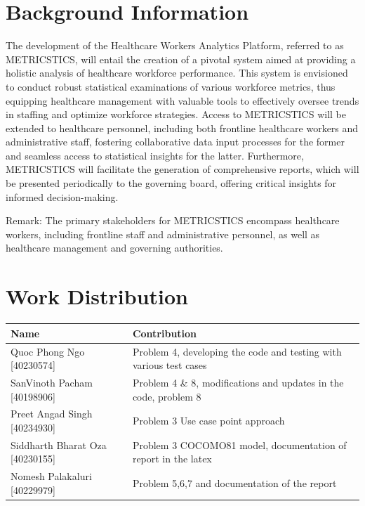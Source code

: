 \documentclass[11pt]{article}
\begin{document}
\section{Background Information}
\raggedright{\normalsize{The development of the Healthcare Workers Analytics Platform, referred to as METRICSTICS, will entail the creation of a pivotal system aimed at providing a holistic analysis of healthcare workforce performance. This system is envisioned to conduct robust statistical examinations of various workforce metrics, thus equipping healthcare management with valuable tools to effectively oversee trends in staffing and optimize workforce strategies. Access to METRICSTICS will be extended to healthcare personnel, including both frontline healthcare workers and administrative staff, fostering collaborative data input processes for the former and seamless access to statistical insights for the latter. Furthermore, METRICSTICS will facilitate the generation of comprehensive reports, which will be presented periodically to the governing board, offering critical insights for informed decision-making.}} \\[2\baselineskip]
\raggedright{\normalsize{Remark: The primary stakeholders for METRICSTICS encompass healthcare workers, including frontline staff and administrative personnel, as well as healthcare management and governing authorities.}}

\pagebreak


\pagebreak

\section{Work Distribution}
\begin{table}[htb]
    \RaggedRight
    \begin{tabular}{|p{4cm}|p{5.5cm}|} \hline 
         Name & Contribution \\ \hline
         Quoc Phong Ngo [40230574] & Problem 4, developing the code and testing with various test cases \\ \hline
        SanVinoth Pacham [40198906] & Problem 4 \& 8, modifications and updates in the code, problem 8 \\ \hline
        Preet Angad Singh [40234930] & Problem 3 Use case point approach\\ \hline
        Siddharth Bharat Oza [40230155]	& Problem 3 COCOMO81 model, documentation of report in the latex\\ \hline
        Nomesh Palakaluri [40229979] & Problem 5,6,7 and documentation of the report\\ \hline
    \end{tabular}
    \label{tab:my_label}
\end{table}
\end{document}

